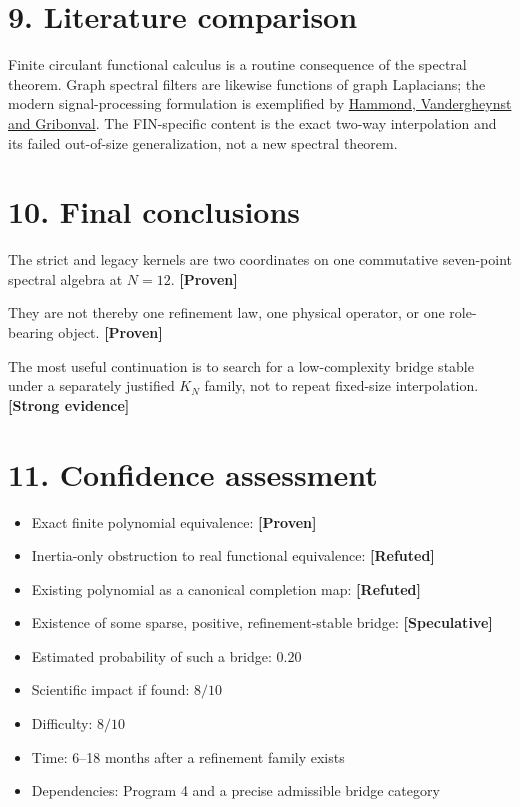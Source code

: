 \documentclass[11pt,a4paper,openany]{report}
\newcommand{\statusProven}{\textcolor{fingreen}{[Proven]}}
\newcommand{\statusStrong}{\textcolor{finblue}{[Strong evidence]}}
\newcommand{\statusSpeculative}{\textcolor{finorange}{[Speculative]}}
\newcommand{\statusRefuted}{\textcolor{finred}{[Refuted]}}
\begin{document}
\section{9. Literature comparison}

Finite circulant functional calculus is a routine consequence of the spectral theorem. Graph spectral filters are likewise functions of graph Laplacians; the modern signal-processing formulation is exemplified by \href{https://arxiv.org/abs/0912.3848}{Hammond, Vandergheynst and Gribonval}. The FIN-specific content is the exact two-way interpolation and its failed out-of-size generalization, not a new spectral theorem.

\section{10. Final conclusions}

The strict and legacy kernels are two coordinates on one commutative seven-point spectral algebra at \(N=12\). \textbf{\statusProven{}}

They are not thereby one refinement law, one physical operator, or one role-bearing object. \textbf{\statusProven{}}

The most useful continuation is to search for a low-complexity bridge stable under a separately justified \(K_N\) family, not to repeat fixed-size interpolation. \textbf{\statusStrong{}}

\section{11. Confidence assessment}

\begin{itemize}
\item 
Exact finite polynomial equivalence: \textbf{\statusProven{}}

\item 
Inertia-only obstruction to real functional equivalence: \textbf{\statusRefuted{}}

\item 
Existing polynomial as a canonical completion map: \textbf{\statusRefuted{}}

\item 
Existence of some sparse, positive, refinement-stable bridge: \textbf{\statusSpeculative{}}

\item 
Estimated probability of such a bridge: \(0.20\)

\item 
Scientific impact if found: \(8/10\)

\item 
Difficulty: \(8/10\)

\item 
Time: 6–18 months after a refinement family exists

\item 
Dependencies: Program 4 and a precise admissible bridge category

\end{itemize}
\end{document}
